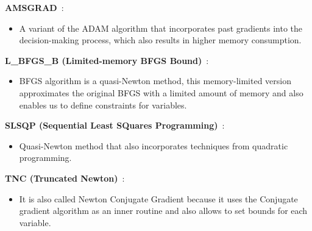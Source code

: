 \textbf{AMSGRAD}~\cite{amsgrad}:
\begin{itemize}
    \item A variant of the ADAM algorithm that incorporates past gradients into the decision-making process, which also results in higher memory consumption.
\end{itemize}
\textbf{L\_BFGS\_B (Limited-memory BFGS Bound)}~\cite{lbfgsb}:
\begin{itemize}
    \item BFGS algorithm is a quasi-Newton method, this memory-limited version approximates the original BFGS with a limited amount of memory and also enables us to define constraints for variables.
\end{itemize}
\textbf{SLSQP (Sequential Least SQuares Programming)}~\cite{slsqp}:
\begin{itemize}
    \item Quasi-Newton method that also incorporates techniques from quadratic programming.
\end{itemize}
\textbf{TNC (Truncated Newton)}~\cite{tnc}:
\begin{itemize}
    \item It is also called Newton Conjugate Gradient because it uses the Conjugate gradient algorithm as an inner routine and also allows to set bounds for each variable.
\end{itemize}

